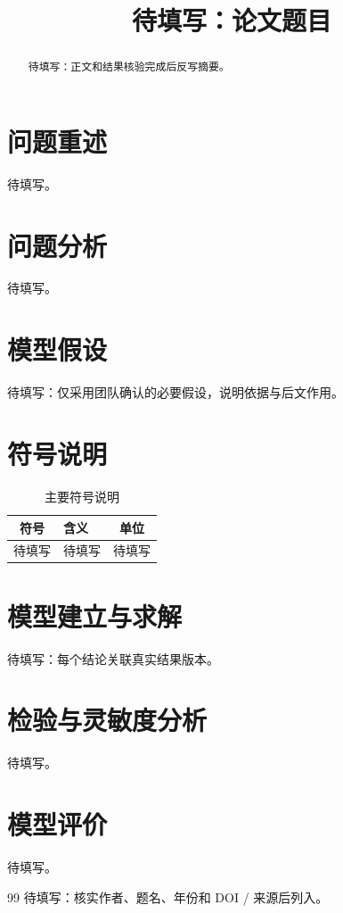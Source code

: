 \documentclass[withoutpreface]{cumcmthesis}
\title{待填写：论文题目}
\begin{document}
\maketitle
\begin{abstract}
待填写：正文和结果核验完成后反写摘要。
\end{abstract}

\section{问题重述}
待填写。
\section{问题分析}
待填写。
\section{模型假设}
待填写：仅采用团队确认的必要假设，说明依据与后文作用。
\section{符号说明}
\begin{table}[htbp]
\centering
\caption{主要符号说明}
\label{tab:symbols}
\begin{tabularx}{0.95\textwidth}{cXc}
\toprule
符号 & 含义 & 单位 \\
\midrule
待填写 & 待填写 & 待填写 \\
\bottomrule
\end{tabularx}
\end{table}
\section{模型建立与求解}
待填写：每个结论关联真实结果版本。
\section{检验与灵敏度分析}
待填写。
\section{模型评价}
待填写。


\begin{thebibliography}{99}
 待填写：核实作者、题名、年份和 DOI / 来源后列入。
\end{thebibliography}
\end{document}

